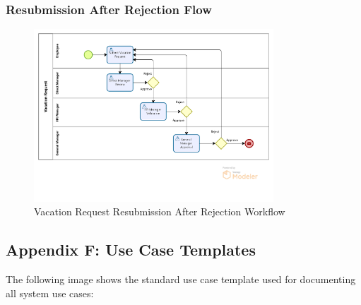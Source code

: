 \documentclass[12pt,a4paper]{article}
\begin{document}
\subsubsection{Resubmission After Rejection Flow}
\begin{figure}[H]
\centering
\includegraphics[width=0.8\textwidth]{Diagrams/Workflows/Vacation-Request-Resubmission-After-Rejection/Vacation-Request-Resubmission-After-Rejection.png}
\caption{Vacation Request Resubmission After Rejection Workflow}
\label{fig:resubmission-flow}
\end{figure}

\subsection{Appendix F: Use Case Templates}
The following image shows the standard use case template used for documenting all system use cases:
\end{document}
